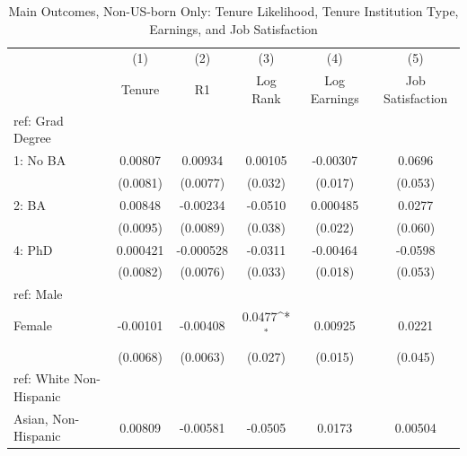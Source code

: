 \begin{table}[htbp]\centering
\def\sym#1{\ifmmode^{#1}\else\(^{#1}\)\fi}
\caption{Main Outcomes, Non-US-born Only: Tenure Likelihood, Tenure Institution Type, Earnings, and Job Satisfaction \label{tab1}}
\begin{tabular}{l*{5}{c}}
\hline\hline
  &\multicolumn{1}{c}{(1)}&\multicolumn{1}{c}{(2)}&\multicolumn{1}{c}{(3)}&\multicolumn{1}{c}{(4)}&\multicolumn{1}{c}{(5)}\\
  &\multicolumn{1}{c}{Tenure}&\multicolumn{1}{c}{R1}&\multicolumn{1}{c}{Log Rank}&\multicolumn{1}{c}{Log Earnings}&\multicolumn{1}{c}{Job Satisfaction}\\
\hline
ref: Grad Degree&                     &                     &                     &                     &                     \\
[1em]
1: No BA&     0.00807         &     0.00934         &     0.00105         &    -0.00307         &      0.0696         \\
  &    (0.0081)         &    (0.0077)         &     (0.032)         &     (0.017)         &     (0.053)         \\
[1em]
2: BA&     0.00848         &    -0.00234         &     -0.0510         &    0.000485         &      0.0277         \\
  &    (0.0095)         &    (0.0089)         &     (0.038)         &     (0.022)         &     (0.060)         \\
[1em]
4: PhD&    0.000421         &   -0.000528         &     -0.0311         &    -0.00464         &     -0.0598         \\
  &    (0.0082)         &    (0.0076)         &     (0.033)         &     (0.018)         &     (0.053)         \\
[1em]
ref: Male&                     &                     &                     &                     &                     \\
[1em]
Female&    -0.00101         &    -0.00408         &      0.0477\sym{*}  &     0.00925         &      0.0221         \\
  &    (0.0068)         &    (0.0063)         &     (0.027)         &     (0.015)         &     (0.045)         \\
[1em]
ref: White Non-Hispanic&                     &                     &                     &                     &                     \\
[1em]
Asian, Non-Hispanic&     0.00809         &    -0.00581         &     -0.0505         &      0.0173         &     0.00504         \\

\end{tabular}
\end{table}
